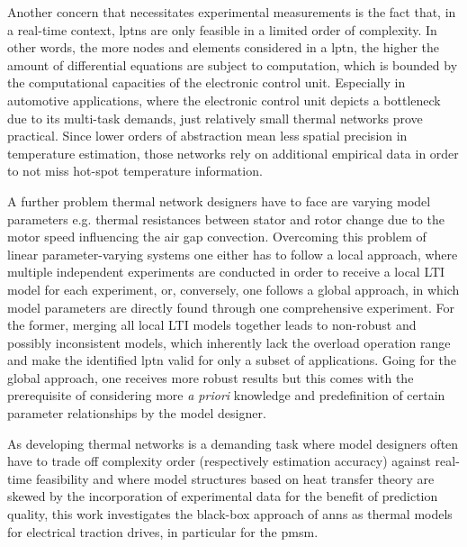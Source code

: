 Another concern that necessitates experimental measurements is the fact that, in a real-time context, \glspl{lptn} are only feasible in a limited order of complexity.
In other words, the more nodes and elements considered in a \gls{lptn}, the higher the amount of differential equations are subject to computation, which is bounded by the computational capacities of the electronic control unit.
Especially in automotive applications, where the electronic control unit depicts a bottleneck due to its multi-task demands, just relatively small thermal networks prove practical.
Since lower orders of abstraction mean less spatial precision in temperature estimation, those networks rely on additional empirical data in order to not miss hot-spot temperature information.

A further problem thermal network designers have to face are varying model parameters e.g. thermal resistances between stator and rotor change due to the motor speed influencing the air gap convection.
Overcoming this problem of linear parameter-varying systems one either has to follow a local approach, where multiple independent experiments are conducted in order to receive a local LTI model for each experiment, or, conversely, one follows a global approach, in which model parameters are directly found through one comprehensive experiment.
For the former, merging all local LTI models together leads to non-robust and possibly inconsistent models, which inherently lack the overload operation range and make the identified \gls{lptn} valid for only a subset of applications.
Going for the global approach, one receives more robust results but this comes with the prerequisite of considering more \textit{a priori} knowledge and predefinition of certain parameter relationships by the model designer.

As developing thermal networks is a demanding task where model designers often have to trade off complexity order (respectively estimation accuracy) against real-time feasibility and where model structures based on heat transfer theory are skewed by the incorporation of experimental data for the benefit of prediction quality, this work investigates the black-box approach of \glspl{ann} as thermal models for electrical traction drives, in particular for the \gls{pmsm}.


